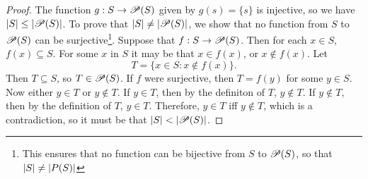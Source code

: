 \begin{proof}
	The function $g:S\rightarrow \mathscr P(S)$ given by $g(s)=\{s\}$ is injective, so we have $\abs{S}\leq \abs{\mathscr P(S)}$. To prove that $\abs{S}\neq \abs{\mathscr P(S)}$, we show that no function from $S$ to $\mathscr P(S)$ can be surjective\footnote{This ensures that no function can be bijective from $S$ to $\mathscr P(S)$, so that $\abs{S}\neq \abs{P(S)}$}. Suppose that $f:S\rightarrow \mathscr P(S)$. Then for each $x\in S$, $f(x)\subseteq S$. For some $x$ in $S$ it may be that $x\in f(x)$, or $x\notin f(x)$. Let 
	$$T=\{x\in S:x\notin f(x)\}.$$
	Then $T\subseteq S$, so $T\in \mathscr P(S)$. If $f$ were surjective, then $T=f(y)$ for some $y\in S$. Now either $y\in T$ or $y\notin T$. If $y\in T$, then by the definiton of $T$, $y\notin T$. If $y\notin T$, then by the definition of $T$, $y\in T$. Therefore, $y\in T$ iff $y\notin T$, which is a contradiction, so it must be that $\abs{S}<\abs{\mathscr P(S)}$.
\end{proof}
















































